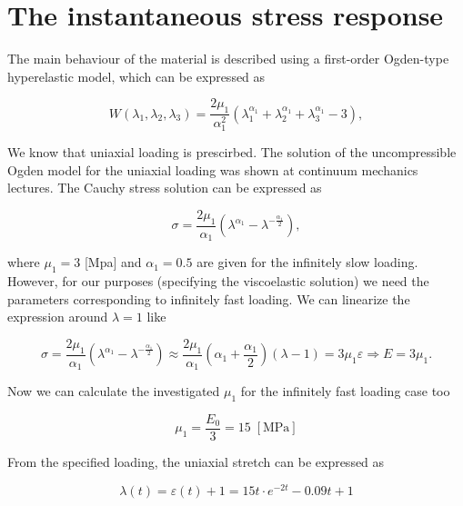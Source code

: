 \documentclass[12pt,a4paper]{article}
\begin{document}
\section{The instantaneous stress response}

The main behaviour of the material is described using a first-order Ogden-type hyperelastic model, which can be expressed as 

\begin{equation}
    W(\lambda_1, \lambda_2, \lambda_3) = \frac{2\mu_1}{\alpha_1^2} \left( \lambda_1^{\alpha_1} + \lambda_2^{\alpha_1} + \lambda_3^{\alpha_1} - 3 \right), 
\end{equation}

We know that uniaxial loading is prescirbed. The solution of the uncompressible Ogden model for the uniaxial loading was shown at continuum mechanics lectures. The Cauchy stress solution can be expressed as

\begin{equation}
\sigma = \frac{2\mu_1}{\alpha_1}(\lambda^{\alpha_1} - \lambda^{-\frac{\alpha_1}{2}}),
\end{equation}

where $\mu_1 = 3$ [Mpa] and $\alpha_1 = 0.5$ are given for the infinitely slow loading. However, for our purposes (specifying the viscoelastic solution) we need the parameters corresponding to infinitely fast loading. We can linearize the expression around $\lambda = 1$ like

\begin{equation}
    \sigma = \frac{2\mu_1}{\alpha_1}(\lambda^{\alpha_1} - \lambda^{-\frac{\alpha_1}{2}}) \approx \frac{2\mu_1}{\alpha_1} \left(\alpha_1 + \frac{\alpha_1}{2}\right) (\lambda - 1) = 3\mu_1 \varepsilon \Rightarrow E = 3 \mu_1.
    \end{equation}

Now we can calculate the investigated $\mu_1$ for the infinitely fast loading case too

\begin{equation}
    \mu_1 = \frac{E_0}{3} = 15 \;[\text{MPa}]
\end{equation}

From the specified loading, the uniaxial stretch can be expressed as

\begin{equation}
\lambda(t) = \varepsilon(t) + 1 = 15t\cdot e^{-2t}-0.09t + 1
\end{equation}
\end{document}
